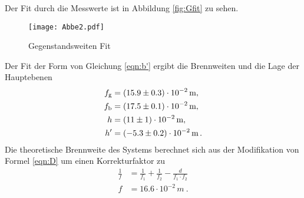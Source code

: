 Der Fit durch die Messwerte ist in Abbildung \ref{fig:Gfit} zu sehen.
\begin{figure}
  \centering
  \texttt{[image: Abbe2.pdf]}
  \caption{Gegenstandsweiten Fit}
  \label{fig:Bfit}
\end{figure}
Der Fit der Form von Gleichung \eqref{eqn:b'} ergibt die Brennweiten und die Lage der Hauptebenen
\begin{eqnarray}
  f_\text{g} &= (\num{ 15.9 +- 0.3}) \cdot 10^{-2} \, \text{m} , \\
  f_\text{b} &= (\num{ 17.5 +- 0.1 }) \cdot 10^{-2} \, \text{m} , \\
  h &= (\num{ 11 +- 1}) \cdot 10^{-2} \, \text{m} ,\\
  h' &= (\num{ -5.3 +- 0.2}) \cdot 10^{-2} \,\text{m} \, .
  \label{eqn:abbedf}
\end{eqnarray}
Die theoretische Brennweite des Systems berechnet sich aus der Modifikation von Formel \eqref{eqn:D} um einen Korrekturfaktor zu
\begin{eqnarray}
  \frac{1}{f} &= \frac{1}{f_1} + \frac{1}{f_2} - \frac{d}{f_1 \cdot f_2} \\
  f &= 16.6 \cdot 10^{-2} \, m \ .
  \label{tabbe}
\end{eqnarray}

